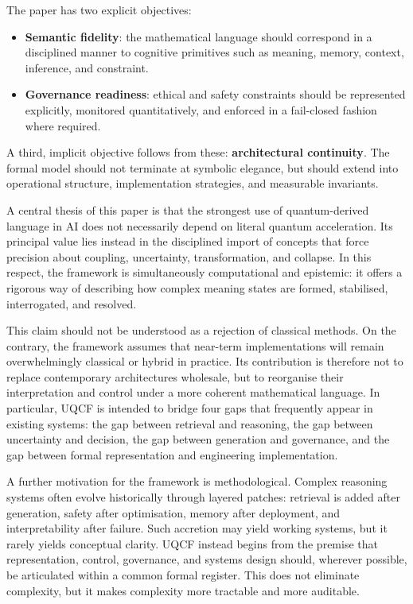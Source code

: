 \documentclass[12pt]{article}
\begin{document}
The paper has two explicit objectives:
\begin{itemize}[leftmargin=2em]
    \item \textbf{Semantic fidelity}: the mathematical language should correspond in a disciplined manner to cognitive primitives such as meaning, memory, context, inference, and constraint.
    \item \textbf{Governance readiness}: ethical and safety constraints should be represented explicitly, monitored quantitatively, and enforced in a fail-closed fashion where required.
\end{itemize}
A third, implicit objective follows from these: \textbf{architectural continuity}. The formal model should not terminate at symbolic elegance, but should extend into operational structure, implementation strategies, and measurable invariants.

A central thesis of this paper is that the strongest use of quantum-derived language in AI does not necessarily depend on literal quantum acceleration. Its principal value lies instead in the disciplined import of concepts that force precision about coupling, uncertainty, transformation, and collapse. In this respect, the framework is simultaneously computational and epistemic: it offers a rigorous way of describing how complex meaning states are formed, stabilised, interrogated, and resolved.

This claim should not be understood as a rejection of classical methods. On the contrary, the framework assumes that near-term implementations will remain overwhelmingly classical or hybrid in practice. Its contribution is therefore not to replace contemporary architectures wholesale, but to reorganise their interpretation and control under a more coherent mathematical language. In particular, UQCF is intended to bridge four gaps that frequently appear in existing systems: the gap between retrieval and reasoning, the gap between uncertainty and decision, the gap between generation and governance, and the gap between formal representation and engineering implementation.

A further motivation for the framework is methodological. Complex reasoning systems often evolve historically through layered patches: retrieval is added after generation, safety after optimisation, memory after deployment, and interpretability after failure. Such accretion may yield working systems, but it rarely yields conceptual clarity. UQCF instead begins from the premise that representation, control, governance, and systems design should, wherever possible, be articulated within a common formal register. This does not eliminate complexity, but it makes complexity more tractable and more auditable.
\end{document}

